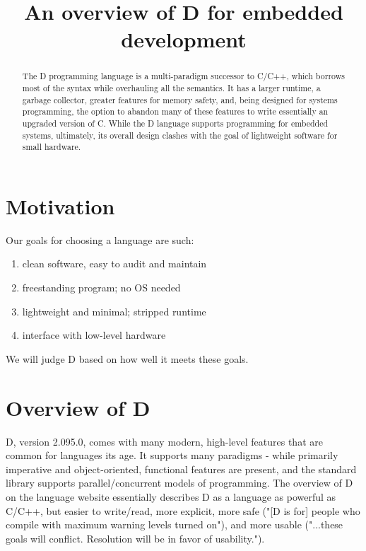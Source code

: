 \documentclass[letterpaper,twocolumn,10pt]{article}
\begin{document}
\date{}

\title{\Large \bf An overview of D for embedded development}

\maketitle


\begin{abstract}

    The D programming language is a multi-paradigm successor to C/C++, which
    borrows most of the syntax while overhauling all the semantics.  It has
    a larger runtime, a garbage collector, greater features for memory safety,
    and, being designed for systems programming, the option to abandon many of
    these features to write essentially an upgraded version of C.  While the D
    language supports programming for embedded systems, ultimately, its overall 
    design clashes with the goal of lightweight software for small hardware.

\end{abstract}

\section*{Motivation}

Our goals for choosing a language are such:

\begin{enumerate}
    \item clean software, easy to audit and maintain
    \item freestanding program; no OS needed
    \item lightweight and minimal; stripped runtime
    \item interface with low-level hardware
\end{enumerate}

We will judge D based on how well it meets these goals.


\section*{Overview of D}

D, version 2.095.0, comes with many modern, high-level features that are 
common for languages its age.  It supports many paradigms - while primarily 
imperative and object-oriented, functional features are present, and 
the standard library supports parallel/concurrent models of programming.  
The overview of D on the language website \cite{overview} essentially 
describes D as a language as powerful as C/C++, but easier to write/read, 
more explicit, more safe ("[D is for] people who
compile with maximum warning levels turned on"), and more usable 
("...these goals will conflict. Resolution will be in favor of usability.").
\end{document}
